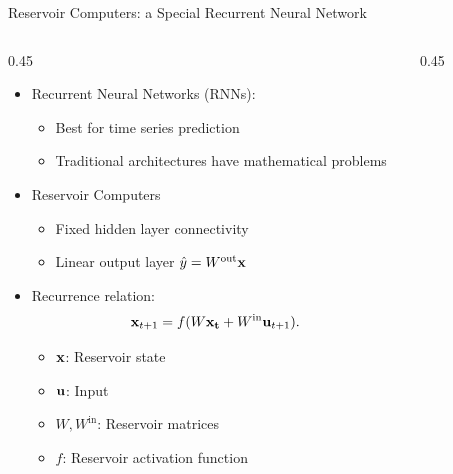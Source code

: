 \documentclass[10pt, aspectratio=169]{beamer}
\begin{document}
\begin{frame}{Reservoir Computers: a Special Recurrent Neural Network}
\begin{columns}
	\begin{column}{0.45\textwidth}
		\begin{itemize}
			\item Recurrent Neural Networks (RNNs):
			\begin{itemize}
				\item Best for time series prediction
				\item Traditional architectures have mathematical problems
			\end{itemize}
			\pause
			\item Reservoir Computers \cite{jaeger2001}
			\begin{itemize}
				\item Fixed hidden layer connectivity
				\item Linear output layer $\hat{y} = W^\text{out}\vb{x}$
			\end{itemize}
			\pause
			\item Recurrence relation:
			\begin{equation}
				\vb{x}_{t+1} = f(W \vb{x_t} + W^\text{in} \vb{u}_{t+1}).
			\end{equation}
			\begin{itemize}
				\item $\vb{x}$: Reservoir state
				\item $\vb{u}$: Input
				\item $W, W^\text{in}$: Reservoir matrices
				\item $f$: Reservoir activation function
			\end{itemize}
		\end{itemize}
	\end{column}
	\hfill
	\begin{column}{0.45\textwidth}
		\begin{figure}
			\centering
\end{figure}
\end{column}
\end{columns}
\end{frame}
\end{document}
